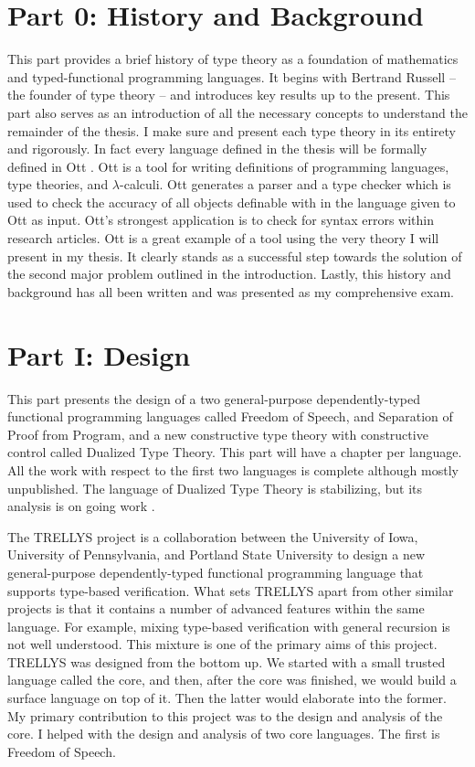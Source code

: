 \section{Part 0: History and Background}
\label{sec:history_and_background}
This part provides a brief history of type theory as a foundation of
mathematics and typed-functional programming languages.  It begins
with Bertrand Russell -- the founder of type theory -- and introduces
key results up to the present. This part also serves as an
introduction of all the necessary concepts to understand the remainder
of the thesis.  I make sure and present each type theory in its
entirety and rigorously.  In fact every language defined in the thesis
will be formally defined in Ott \cite{Sewell:2010}.  Ott is a tool for
writing definitions of programming languages, type theories, and
$\lambda$-calculi.  Ott generates a parser and a type checker which is
used to check the accuracy of all objects definable with in the
language given to Ott as input.  Ott's strongest application is to
check for syntax errors within research articles.  Ott is a great
example of a tool using the very theory I will present in my thesis.
It clearly stands as a successful step towards the solution of the
second major problem outlined in the introduction.  Lastly, this
history and background has all been written and was presented as my
comprehensive exam.

\section{Part I: Design}
\label{sec:design}

This part presents the design of a two general-purpose
dependently-typed functional programming languages called Freedom of
Speech, and Separation of Proof from Program, and a new constructive
type theory with constructive control called Dualized Type Theory.
This part will have a chapter per language. All the work with
respect to the first two languages is complete although mostly
unpublished.  The language of Dualized Type Theory is stabilizing, but
its analysis is on going work \cite{Stump:2013}.

The TRELLYS project is a collaboration between the University of Iowa,
University of Pennsylvania, and Portland State University to design a
new general-purpose dependently-typed functional programming language
that supports type-based verification.  What sets TRELLYS apart from
other similar projects is that it contains a number of advanced
features within the same language.  For example, mixing type-based
verification with general recursion is not well understood.  This
mixture is one of the primary aims of this project.  TRELLYS was
designed from the bottom up.  We started with a small trusted language
called the core, and then, after the core was finished, we would build
a surface language on top of it. Then the latter would elaborate into
the former.  My primary contribution to this project was to the design
and analysis of the core.  I helped with the design and analysis of
two core languages.  The first is Freedom of Speech.

